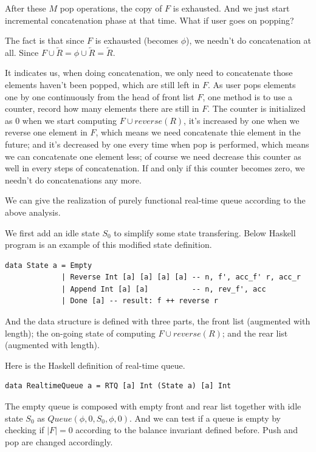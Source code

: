 \documentclass[UTF8]{article}
\begin{document}
After these $M$ pop operations, the copy of $F$ is exhausted. And we just
start incremental concatenation phase at that time. What if user goes
on popping?

The fact is that since $F$ is exhausted (becomes $\phi$), we needn't do concatenation
at all. Since $F \cup \overleftarrow{R} = \phi \cup \overleftarrow{R} = \overleftarrow{R}$.

It indicates us, when doing concatenation, we only need to concatenate those elements
haven't been popped, which are still left in $F$. As user pops elements one by one
continuously from the head of front list $F$, one method is to use a counter,
record how many elements there are still in $F$. The counter is initialized as 0
when we start computing $F \cup reverse(R)$, it's increased by one when we reverse
one element in $F$, which means we need concatenate thie element in the future;
and it's decreased by one every time when pop is
performed, which means we can concatenate one element less; of course we need decrease
this counter as well in every steps of concatenation. If and only if this counter
becomes zero, we needn't do concatenations any more.

We can give the realization of purely functional real-time queue according to the above
analysis.

We first add an idle state $S_0$ to simplify some state transfering. Below Haskell program
is an example of this modified state definition.

\lstset{language=Haskell}
\begin{lstlisting}
data State a = Empty
             | Reverse Int [a] [a] [a] [a] -- n, f', acc_f' r, acc_r
             | Append Int [a] [a]          -- n, rev_f', acc
             | Done [a] -- result: f ++ reverse r
\end{lstlisting}

And the data structure is defined with three parts, the front list (augmented with length);
the on-going state of computing $F \cup reverse(R)$; and the rear list (augmented with length).

Here is the Haskell definition of real-time queue.

\lstset{language=Haskell}
\begin{lstlisting}
data RealtimeQueue a = RTQ [a] Int (State a) [a] Int
\end{lstlisting}

The empty queue is composed with empty front and rear list together with idle state $S_0$ as
$Queue(\phi, 0, S_0, \phi, 0)$. And we can test if a queue is empty by checking if $|F| = 0$
according
to the balance invariant defined before. Push and pop are changed accordingly.
\end{document}
